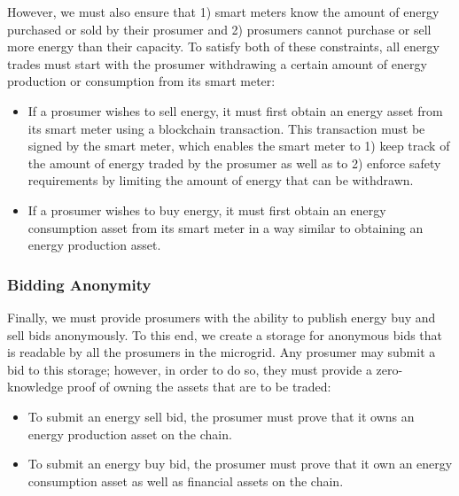 However, we must also ensure that 1) smart meters know the amount of energy purchased or sold by their prosumer and 2) prosumers cannot purchase or sell more energy than their capacity.
To satisfy both of these constraints, all energy trades must start with the prosumer withdrawing a certain amount of energy production or consumption from its smart meter:
\begin{itemize}
\item If a prosumer wishes to sell energy, it must first obtain an energy asset from its smart meter using a blockchain transaction.
This transaction must be signed by the smart meter, which enables the smart meter to 1) keep track of the amount of energy traded by the prosumer as well as to 2) enforce safety requirements by limiting the amount of energy that can be withdrawn.
\item If a prosumer wishes to buy energy, it must first obtain an energy consumption asset from its smart meter in a way similar to obtaining an energy production asset.
\end{itemize}

\subsubsection{Bidding Anonymity}
Finally, we must provide prosumers with the ability to publish energy buy and sell bids anonymously.
To this end, we create a storage for anonymous bids that is readable by all the prosumers in the microgrid.
Any prosumer may submit a bid to this storage; however, in order to do so, they must provide a zero-knowledge proof of owning the assets that are to be traded:
\begin{itemize}
\item To submit an energy sell bid, the prosumer must prove that it owns an energy production asset on the chain.
\item To submit an energy buy bid, the prosumer must prove that it own an energy consumption asset as well as financial assets on the chain.
\end{itemize}


